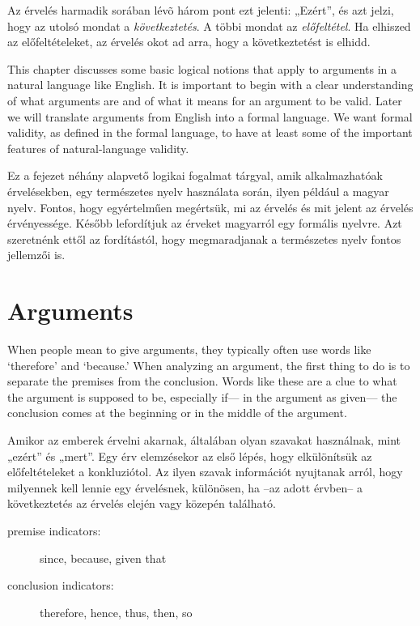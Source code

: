 Az érvelés harmadik sorában lévõ három pont ezt jelenti: „Ezért”, és azt jelzi, hogy az utolsó mondat a \emph{következtetés}. A többi mondat az \emph{előfeltétel}. Ha elhiszed az előfeltételeket, az érvelés okot ad arra, hogy a következtetést is elhidd.

This chapter discusses some basic logical notions that apply to arguments in a natural language like English. It is important to begin with a clear understanding of what arguments are and of what it means for an argument to be valid. Later we will translate arguments from English into a formal language. We want formal validity, as defined in the formal language, to have at least some of the important features of natural-language validity.

Ez a fejezet néhány alapvető logikai fogalmat tárgyal, amik alkalmazhatóak érvelésekben, egy természetes nyelv használata során, ilyen például a magyar nyelv. Fontos, hogy egyértelműen megértsük, mi az érvelés és mit jelent az érvelés érvényessége. Később lefordítjuk az érveket magyarról  egy formális nyelvre. Azt szeretnénk ettől az fordítástól, hogy megmaradjanak a természetes nyelv fontos jellemzői is.

\section{Arguments}
When people mean to give arguments, they typically often use words like `therefore' and `because.' When analyzing an argument, the first thing to do is to separate the premises from the conclusion. Words like these are a clue to what the argument is supposed to be, especially if--- in the argument as given--- the conclusion comes at the beginning or in the middle of the argument.

Amikor az emberek érvelni akarnak, általában olyan szavakat használnak, mint „ezért” és „mert”. Egy érv elemzésekor az első lépés, hogy elkülönítsük az előfeltételeket a konkluziótol. Az ilyen szavak információt nyujtanak arról, hogy milyennek kell lennie egy érvelésnek, különösen, ha --az adott érvben-- a következtetés az érvelés elején vagy közepén található.



\begin{description}
\item[premise indicators:] since, because, given that
\item[conclusion indicators:] therefore, hence, thus, then, so
\end{description}

